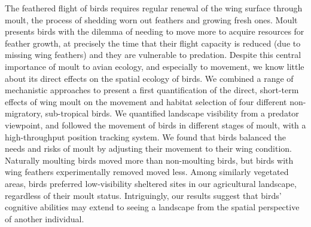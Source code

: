 \small{
    The feathered flight of birds requires regular renewal of the wing surface through moult, the process of shedding worn out feathers and growing fresh ones.
    Moult presents birds with the dilemma of needing to move more to acquire resources for feather growth, at precisely the time that their flight capacity is reduced (due to missing wing feathers) and they are vulnerable to predation.
    Despite this central importance of moult to avian ecology, and especially to movement, we know little about its direct effects on the spatial ecology of birds.
    We combined a range of mechanistic approaches to present a first quantification of the direct, short-term effects of wing moult on the movement and habitat selection of four different non-migratory, sub-tropical birds.
    We quantified landscape visibility from a predator viewpoint, and followed the movement of birds in different stages of moult, with a high-throughput position tracking system.
    We found that birds balanced the needs and risks of moult by adjusting their movement to their wing condition.
    Naturally moulting birds moved more than non-moulting birds, but birds with wing feathers experimentally removed moved less.
    Among similarly vegetated areas, birds preferred low-visibility sheltered sites in our agricultural landscape, regardless of their moult status.
    Intriguingly, our results suggest that birds' cognitive abilities may extend to seeing a landscape from the spatial perspective of another individual.

}

\clearpage
